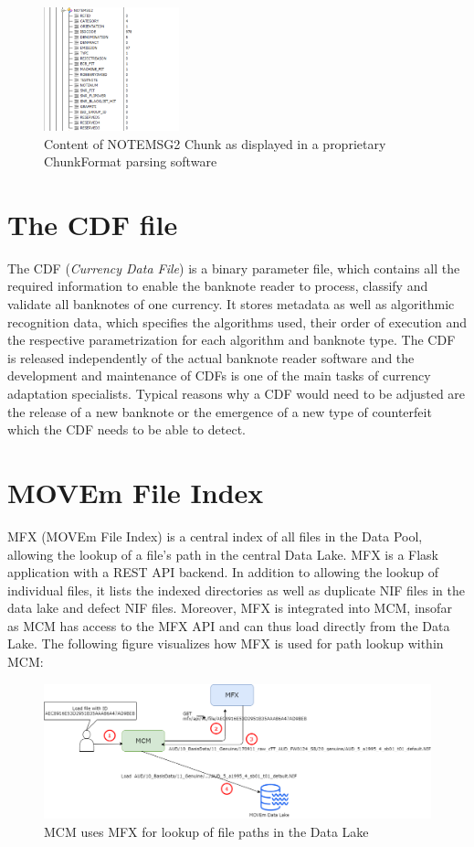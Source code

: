 \begin{figure}
\includegraphics[width=0.35\textwidth]{images/NoteMsg2Chunk}
  \caption{Content of NOTEMSG2 Chunk as displayed in a proprietary ChunkFormat parsing software}\label{fig:notemsg2}
\end{figure}

\section{The CDF file}
The CDF (\emph{Currency Data File}) is a binary parameter file, which contains all the required information to enable the banknote reader to process, classify and validate all banknotes of one currency. It stores metadata as well as algorithmic recognition data, which specifies the algorithms used, their order of execution and the respective parametrization for each algorithm and banknote type. The CDF is released independently of the actual banknote reader software and the development and maintenance of CDFs is one of the main tasks of currency adaptation specialists. Typical reasons why a CDF would need to be adjusted are the release of a new banknote or the emergence of a new type of counterfeit which the CDF needs to be able to detect.

\section{MOVEm File Index}
MFX (MOVEm File Index) is a central index of all files in the Data Pool, allowing the lookup of a file's path in the central Data Lake. MFX is a Flask application with a REST API backend. In addition to allowing the lookup of individual files, it lists the indexed directories as well as duplicate NIF files in the data lake and defect NIF files. Moreover, MFX is integrated into MCM, insofar as MCM has access to the MFX API and can thus load directly from the Data Lake. The following figure visualizes how MFX is used for path lookup within MCM:
\begin{figure}[ht!]
\includegraphics[width=1.0\textwidth]{images/mfx_usage.png}
  \caption{MCM uses MFX for lookup of file paths in the Data Lake}\label{fig:mfx_usage}
\end{figure}



